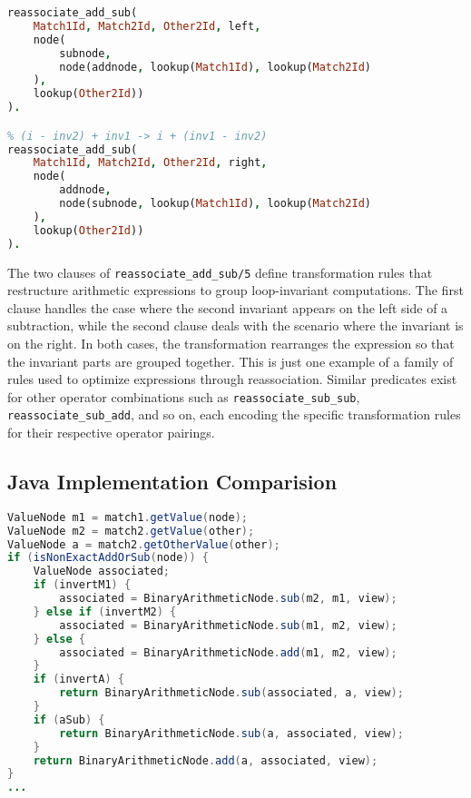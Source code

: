 \begin{lstlisting}[language=Prolog]
% (inv2 - i) + inv1 -> (inv1 + inv2) - i
reassociate_add_sub(
    Match1Id, Match2Id, Other2Id, left,
    node(
        subnode, 
        node(addnode, lookup(Match1Id), lookup(Match2Id)
    ), 
    lookup(Other2Id))
).

% (i - inv2) + inv1 -> i + (inv1 - inv2)
reassociate_add_sub(
    Match1Id, Match2Id, Other2Id, right,
    node(
        addnode, 
        node(subnode, lookup(Match1Id), lookup(Match2Id)
    ), 
    lookup(Other2Id))
).
\end{lstlisting}

The two clauses of \texttt{reassociate\_add\_sub/5} define transformation rules that restructure arithmetic expressions to group loop-invariant computations. The first clause handles the case where the second invariant appears on the left side of a subtraction, while the second clause deals with the scenario where the invariant is on the right. In both cases, the transformation rearranges the expression so that the invariant parts are grouped together. 
This is just one example of a family of rules used to optimize expressions through reassociation. Similar predicates exist for other operator combinations such as \texttt{reassociate\_sub\_sub}, \texttt{reassociate\_sub\_add}, and so on, each encoding the specific transformation rules for their respective operator pairings.

\subsection*{Java Implementation Comparision}

\begin{lstlisting}[language=Java]
ValueNode m1 = match1.getValue(node);
ValueNode m2 = match2.getValue(other);
ValueNode a = match2.getOtherValue(other);
if (isNonExactAddOrSub(node)) {
    ValueNode associated;
    if (invertM1) {
        associated = BinaryArithmeticNode.sub(m2, m1, view);
    } else if (invertM2) {
        associated = BinaryArithmeticNode.sub(m1, m2, view);
    } else {
        associated = BinaryArithmeticNode.add(m1, m2, view);
    }
    if (invertA) {
        return BinaryArithmeticNode.sub(associated, a, view);
    }
    if (aSub) {
        return BinaryArithmeticNode.sub(a, associated, view);
    }
    return BinaryArithmeticNode.add(a, associated, view);
}
...
\end{lstlisting}

